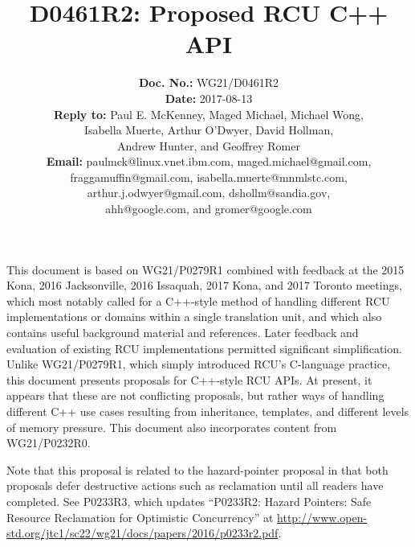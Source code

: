 \documentclass[letterpaper,10pt]{article}
\begin{document}
\newcommand{\co}[1]{\lstinline[breaklines=yes,breakatwhitespace=yes]{#1}}

\title{D0461R2: Proposed RCU C++ API}

\author{
{\bf Doc. No.: } WG21/D0461R2 \\
{\bf Date: } 2017-08-13 \\
{\bf Reply to: } Paul E. McKenney, Maged Michael, Michael Wong,\\
Isabella Muerte, Arthur O'Dwyer, David Hollman, \\
Andrew Hunter, and Geoffrey Romer \\
{\bf Email: } paulmck@linux.vnet.ibm.com, maged.michael@gmail.com, \\
fraggamuffin@gmail.com, isabella.muerte@mnmlstc.com, \\
arthur.j.odwyer@gmail.com, dshollm@sandia.gov, \\
ahh@google.com, and gromer@google.com
} %


\pagestyle{myheadings}

\maketitle


This document is based on WG21/P0279R1 combined with feedback at
the 2015 Kona, 2016 Jacksonville, 2016 Issaquah, 2017 Kona, and
2017 Toronto meetings, which most notably called
for a C++-style method of handling different RCU implementations or
domains within a single translation unit, and which also contains
useful background material and references.
Later feedback and evaluation of existing RCU implementations permitted
significant simplification.
Unlike WG21/P0279R1, which simply introduced RCU's C-language practice,
this document presents proposals for C++-style RCU APIs.
At present, it appears that these are not conflicting proposals, but
rather ways of handling different C++ use cases resulting from
inheritance, templates, and different levels of memory pressure.
This document also incorporates content from
WG21/P0232R0\cite{PaulEMcKennneyToolKitP0232R0}.

Note that this proposal is related to the hazard-pointer proposal in
that both proposals defer destructive actions such as reclamation until
all readers have completed.
See P0233R3, which updates ``P0233R2: Hazard Pointers:
Safe Resource Reclamation for Optimistic Concurrency''
at \url{http://www.open-std.org/jtc1/sc22/wg21/docs/papers/2016/p0233r2.pdf}.
\end{document}
